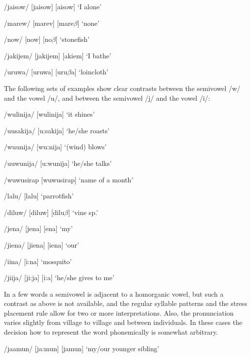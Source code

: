/jaisow/  [{{\textprimstress}jaisow}] {\Tilde} [{{\textprimstress}}{\textyogh}aisow]  `I alone'

/marew/  [ma{{\textprimstress}rev}] {\Tilde} [ma{{\textprimstress}}re$\beta $]  `none'

/now/  [now] {\Tilde} [no$\beta $]  `stonefish'

/jakijem/  [ja{{\textprimstress}kijem}] {\Tilde} [{\textyogh}a{{\textprimstress}}ki{\textyogh}em]  `I bathe'

/uruwa/  [u{{\textprimstress}ruwa}] {\Tilde} [u{{\textprimstress}}ru$\beta $a]  `loincloth'

The following sets of examples show clear contrasts between the semivowel /w/ and the vowel /u/, and between the semivowel /j/ and the vowel /i/:

/wulinija/  [wu{{\textprimstress}linija}]  `it shines'

/uusakija/  [{{\textprimstress}u:sakija}]  `he/she roasts'

/wuunija/  [{{\textprimstress}wu:nija}]  `(wind) blows'

/uuwunija/  [{{\textprimstress}u:wunija}]  `he/she talks'

/wuwusirap  [wu{{\textprimstress}wusirap}]  `name of a month'

/lalu/  [la{{\textprimstress}lu}]  `parrotfish'

/diluw/  [di{{\textprimstress}luw}] {\Tilde} [di{{\textprimstress}lu$\beta $}]  `vine sp.'

/jena/  [je{{\textprimstress}na}] {\Tilde} [{\textyogh}e{{\textprimstress}na}]  `my'

/jiena/  [ji{{\textprimstress}ena}] {\Tilde} [{\textyogh}i{{\textprimstress}ena}]  `our'

/iina/  [{{\textprimstress}i:na}]  `mosquito'

/jiija/  [{{\textprimstress}ji:ja}] {\Tilde} [{{\textprimstress}}{\textyogh}i:{\textyogh}a]  `he/she gives to me'

In a few words a semivowel is adjacent to a homorganic vowel, but such a contrast as above is not available, and the regular syllable patterns and the stress placement rule allow for two or more interpretations. Also, the pronunciation varies slightly from village to village and between individuals.  In these cases the decision how to represent the word phonemically is somewhat arbitrary.

/jaamun/  [{{\textprimstress}ja:mun}] {\Tilde} [j{\textsci{{\textprimstress}}}amun]  `my/our younger sibling'


